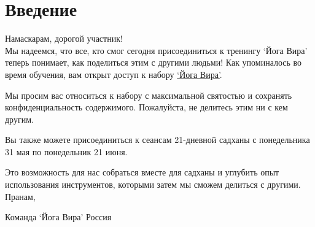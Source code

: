 \section{Введение}
Намаскарам, дорогой участник!
\\

Мы надеемся, что все, кто смог сегодня присоединиться к тренингу ‘Йога Вира’ теперь понимает, как поделиться этим с другими людьми!
Как упоминалось во время обучения, вам открыт доступ к набору \href{https://sites.google.com/ishafoundation.org/yogaveera-russian}{‘Йога Вира’}.

Мы просим вас относиться к набору с максимальной святостью и сохранять конфиденциальность содержимого. Пожалуйста, не делитесь этим ни с кем другим.
 
Вы также можете присоединиться к сеансам 21-дневной садханы с понедельника 31 мая по понедельник 21 июня.

Это возможность для нас собраться вместе для садханы и углубить опыт использования инструментов, которыми затем мы сможем делиться с другими.
\\

Пранам,

Команда ‘Йога Вира’ Россия
